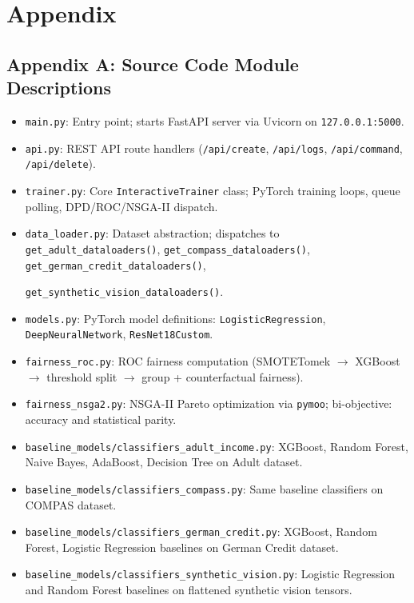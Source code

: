 \documentclass[12pt,a4paper]{article}
\begin{document}
\section{Appendix}

\subsection{Appendix A: Source Code Module Descriptions}
\begin{itemize}
    \item \texttt{main.py}: Entry point; starts FastAPI server via Uvicorn on \texttt{127.0.0.1:5000}.
    \item \texttt{api.py}: REST API route handlers (\texttt{/api/create}, \texttt{/api/logs}, \texttt{/api/command}, \texttt{/api/delete}).
    \item \texttt{trainer.py}: Core \texttt{InteractiveTrainer} class; PyTorch training loops, queue polling, DPD/ROC/NSGA-II dispatch.
    \item \texttt{data\_loader.py}: Dataset abstraction; dispatches to \texttt{get\_adult\_dataloaders()}, \texttt{get\_compass\_dataloaders()}, \texttt{get\_german\_credit\_dataloaders()}, 
    
    \texttt{get\_synthetic\_vision\_dataloaders()}.
    \item \texttt{models.py}: PyTorch model definitions: \texttt{LogisticRegression}, \texttt{DeepNeuralNetwork}, \texttt{ResNet18Custom}.
    \item \texttt{fairness\_roc.py}: ROC fairness computation (SMOTETomek $\rightarrow$ XGBoost $\rightarrow$ threshold split $\rightarrow$ group + counterfactual fairness).
    \item \texttt{fairness\_nsga2.py}: NSGA-II Pareto optimization via \texttt{pymoo}; bi-objective: accuracy and statistical parity.
    \item \texttt{baseline\_models/classifiers\_adult\_income.py}: XGBoost, Random Forest, Naive Bayes, AdaBoost, Decision Tree on Adult dataset.
    \item \texttt{baseline\_models/classifiers\_compass.py}: Same baseline classifiers on COMPAS dataset.
    \item \texttt{baseline\_models/classifiers\_german\_credit.py}: XGBoost, Random Forest, Logistic Regression baselines on German Credit dataset.
    \item \texttt{baseline\_models/classifiers\_synthetic\_vision.py}: Logistic Regression and Random Forest baselines on flattened synthetic vision tensors.
\end{itemize}
\end{document}
